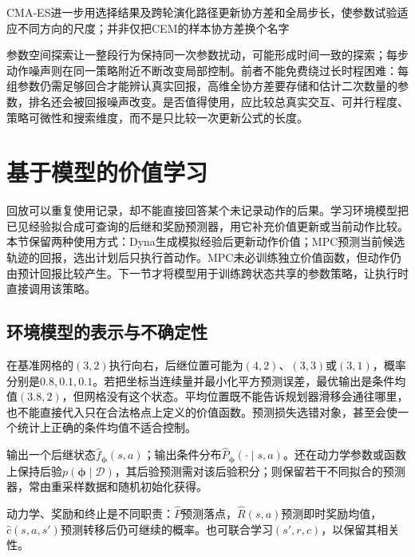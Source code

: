 CMA-ES进一步用选择结果及跨轮演化路径更新协方差和全局步长，使参数试验适应不同方向的尺度；并非仅把CEM的样本协方差换个名字

参数空间探索让一整段行为保持同一次参数扰动，可能形成时间一致的探索；每步动作噪声则在同一策略附近不断改变局部控制。前者不能免费绕过长时程困难：每组参数仍需足够回合才能辨认真实回报，高维全协方差要存储和估计二次数量的参数，排名还会被回报噪声改变。是否值得使用，应比较总真实交互、可并行程度、策略可微性和搜索维度，而不是只比较一次更新公式的长度。

\section{基于模型的价值学习}
\label{sec:rl-learning-model-value}

回放可以重复使用记录，却不能直接回答某个未记录动作的后果。学习环境模型把已见经验拟合成可查询的后继和奖励预测器，用它补充价值更新或当前动作比较。本节保留两种使用方式：Dyna生成模拟经验后更新动作价值；MPC预测当前候选轨迹的回报，选出计划后只执行首动作。MPC未必训练独立价值函数，但动作仍由预计回报比较产生。下一节才将模型用于训练跨状态共享的参数策略，让执行时直接调用该策略。

\subsection{环境模型的表示与不确定性}
\label{sec:rl-learning-model-representation}

在基准网格的$(3,2)$执行向右，后继位置可能为$(4,2)$、$(3,3)$或$(3,1)$，概率分别是$0.8,0.1,0.1$。若把坐标当连续量并最小化平方预测误差，最优输出是条件均值$(3.8,2)$，但网格没有这个状态。平均位置既不能告诉规划器滑移会通往哪里，也不能直接代入只在合法格点上定义的价值函数。预测损失选错对象，甚至会使一个统计上正确的条件均值不适合控制。

\begin{definition}[学习模型的预测对象]
  \label{def:rl-learning-learned-model}
  输出一个后继状态$\widehat f_{\bm\phi}(s,a)$；输出条件分布$\widehat P_{\bm\phi}(\cdot\mid s,a)$。还在动力学参数或函数上保持后验$p(\bm\phi\mid\mathcal D)$，其后验预测需对该后验积分；则保留若干不同拟合的预测器，常由重采样数据和随机初始化获得。

  动力学、奖励和终止是不同职责：$\widehat P$预测落点，$\widehat R(s,a)$预测即时奖励均值，$\widehat c(s,a,s')$预测转移后仍可继续的概率。也可联合学习$(s',r,c)$，以保留其相关性。
\end{definition}

